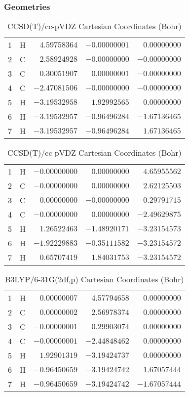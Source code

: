 \documentclass[10pt,oneside]{article}
\begin{document}
\begin{table}[h!]
\subsubsection*{Geometries}
\begin{multicols}{2}
\centering
\caption{CCSD(T)/cc-pVTZ Cartesian Coordinates (Bohr)}
\begin{tabular}{llrrr}
\toprule
1  & H  & $ 4.59758364$ & $-0.00000001$ & $ 0.00000000$ \\
2  & C  & $ 2.58924928$ & $-0.00000000$ & $-0.00000000$ \\
3  & C  & $ 0.30051907$ & $ 0.00000001$ & $-0.00000000$ \\
4  & C  & $-2.47081506$ & $-0.00000000$ & $-0.00000000$ \\
5  & H  & $-3.19532958$ & $ 1.92992565$ & $ 0.00000000$ \\
6  & H  & $-3.19532957$ & $-0.96496284$ & $-1.67136465$ \\
7  & H  & $-3.19532957$ & $-0.96496284$ & $ 1.67136465$ \\
\bottomrule
\end{tabular}
\caption{CCSD(T)/cc-pVDZ Cartesian Coordinates (Bohr)}
\begin{tabular}{llrrr}
\toprule
1  & H  & $-0.00000000$ & $ 0.00000000$ & $ 4.65955562$ \\
2  & C  & $-0.00000000$ & $ 0.00000000$ & $ 2.62125503$ \\
3  & C  & $ 0.00000000$ & $-0.00000000$ & $ 0.29791715$ \\
4  & C  & $-0.00000000$ & $ 0.00000000$ & $-2.49629875$ \\
5  & H  & $ 1.26522463$ & $-1.48920171$ & $-3.23154573$ \\
6  & H  & $-1.92229883$ & $-0.35111582$ & $-3.23154572$ \\
7  & H  & $ 0.65707419$ & $ 1.84031753$ & $-3.23154572$ \\
\bottomrule
\end{tabular}
\end{multicols}
\end{table}

\begin{table}[h]
\centering
\caption{B3LYP/6-31G(2df,p) Cartesian Coordinates (Bohr)}
\begin{tabular}{llrrr}
\toprule
1  & H  & $ 0.00000007$ & $ 4.57794658$ & $ 0.00000000$ \\
2  & C  & $ 0.00000002$ & $ 2.56978374$ & $ 0.00000000$ \\
3  & C  & $-0.00000001$ & $ 0.29903074$ & $ 0.00000000$ \\
4  & C  & $-0.00000001$ & $-2.44848462$ & $ 0.00000000$ \\
5  & H  & $ 1.92901319$ & $-3.19424737$ & $ 0.00000000$ \\
6  & H  & $-0.96450659$ & $-3.19424742$ & $ 1.67057444$ \\
7  & H  & $-0.96450659$ & $-3.19424742$ & $-1.67057444$ \\
\bottomrule
\end{tabular}
\end{table}
\end{document}
